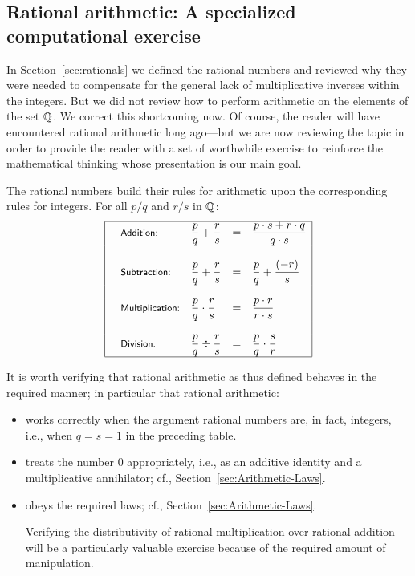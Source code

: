 \subsection{Rational arithmetic: A specialized computational exercise}
\label{sec:Rational-arithmetic}

In Section~\ref{sec:rationals} we defined the rational numbers and
reviewed why they were needed to compensate for the general lack of
multiplicative inverses within the integers.  But we did not review
how to perform arithmetic on the elements of the set $\mathbb{Q}$.  We correct
this shortcoming now.  Of course, the reader will have encountered
rational arithmetic long ago---but we are now reviewing the topic in
order to provide the reader with a set of worthwhile exercise to
reinforce the mathematical thinking whose presentation is our main
goal.

\medskip

The rational numbers build their rules for arithmetic upon the
corresponding rules for integers.  For all $p/q$ and $r/s$ in $\mathbb{Q}$:
\[
\begin{array}{|llcl|}
\hline
\mbox{\small\sf Addition:} & 
{\displaystyle
{p \over q} + {r \over s} }
  & = &
{\displaystyle
 \frac{p \cdot s + r \cdot q}{q \cdot s} }  \\
 & & & \\
\mbox{\small\sf Subtraction:} &
{\displaystyle
{p \over q} + {r \over s} }
  & = & 
{\displaystyle
{p \over q} + {(-r) \over s} } \\
 & & & \\
\mbox{\small\sf Multiplication:} &
{\displaystyle
{p \over q} \cdot {r \over s} }
  & = & 
{\displaystyle
\frac{p \cdot r}{r \cdot s} } \\
  & & & \\
\mbox{\small\sf Division:} &
{\displaystyle
{p \over q} \div {r \over s} }
  & = &
{\displaystyle
{p \over q} \cdot {s \over r} } \\
\hline
\end{array}
\]

It is worth verifying that rational arithmetic as thus defined behaves
in the required manner; in particular that rational arithmetic:
\begin{itemize}
\item
works correctly when the argument rational numbers are, in fact,
integers, i.e., when $q = s = 1$ in the preceding table.
\item
treats the number $0$ appropriately, i.e., as an additive identity and
a multiplicative annihilator; cf., Section~\ref{sec:Arithmetic-Laws}.
\item
obeys the required laws; cf., Section~\ref{sec:Arithmetic-Laws}.

Verifying the distributivity of rational multiplication over rational
addition will be a particularly valuable exercise because of the
required amount of manipulation.
\end{itemize}


